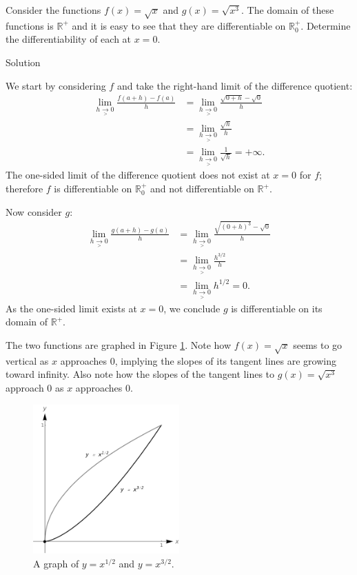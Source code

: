 \begin{example}\label{ex_diff_closed1}
Consider the functions $f(x) = \sqrt{x}$ and $g(x) = \sqrt{x^3}$. The domain of these functions is $\mathbb{R}^+$ and it is easy to see that they are differentiable on $\mathbb{R}^+_0$. Determine the differentiability of each at $x=0$.

Solution 

We start by considering $f$ and take the right-hand limit of the difference quotient:
\begin{align*}
\lim_{h\underset{>}{\rightarrow}0}\frac{f(a+h)-f(a)}{h} &= \lim_{h\underset{>}{\rightarrow}0}\frac{\sqrt{0+h}-\sqrt{0}}h \\
 &= \lim_{h\underset{>}{\rightarrow}0}\frac{\sqrt{h}}h\\
 &= \lim_{h\underset{>}{\rightarrow}0}\frac{1}{\sqrt{h}} = +\infty.
\end{align*}
The one-sided limit of the difference quotient does not exist at $x=0$ for $f$; therefore $f$ is differentiable on $\mathbb{R}^+_0$ and not differentiable on $\mathbb{R}^+$.

Now consider $g$:
\begin{align*}
\lim_{h\underset{>}{\rightarrow}0}\frac{g(a+h)-g(a)}{h} &= \lim_{h\underset{>}{\rightarrow}0}\frac{\sqrt{(0+h)^3}-\sqrt{0}}h \\
 &= \lim_{h\underset{>}{\rightarrow}0}\frac{h^{3/2}}h\\
 &= \lim_{h\underset{>}{\rightarrow}0}h^{1/2} = 0.
\end{align*}
As the one-sided limit exists at $x=0$, we conclude $g$ is differentiable on its domain of $\mathbb{R}^+$.

The two functions are graphed in Figure \ref{fig_diff_5}. Note how $f(x) = \sqrt{x}$ seems to go vertical as $x$ approaches 0, implying the slopes of its tangent lines are growing toward infinity.
Also note how the slopes of the tangent lines to $g(x)= \sqrt{x^3}$ approach 0 as $x$ approaches 0.


\begin{figure}[H]
	\begin{center}
			\includegraphics[width=0.5\textwidth]{fig_diff_5}
	\caption{A graph of $y=x^{1/2}$ and $y=x^{3/2}$.}
	\label{fig_diff_5}
	\end{center}
\end{figure}
\end{example}

